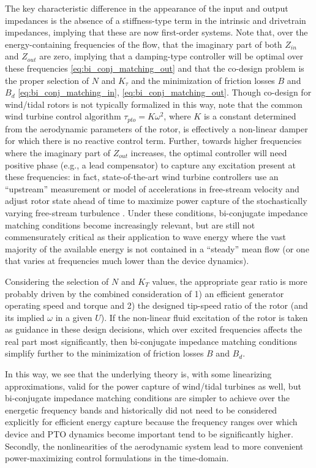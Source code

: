 \documentclass[lettersize,journal]{IEEEtran}
\begin{document}
{The key characteristic difference in the appearance of the input and output impedances is the absence of a stiffness-type term in the intrinsic and drivetrain impedances, implying that these are now first-order systems.
Note that, over the energy-containing frequencies of the flow, that the imaginary part of both $Z_{in}$ and $Z_{out}$ are zero, implying that a damping-type controller will be optimal over these frequencies \eqref{eq:bi_conj_matching_out} and that the co-design problem is the proper selection of $N$ and $K_\tau$ and the minimization of friction losses $B$ and $B_d$ \eqref{eq:bi_conj_matching_in}, \eqref{eq:bi_conj_matching_out}.
Though co-design for wind/tidal rotors is not typically formalized in this way, note that the common wind turbine control algorithm $\tau_{pto} = K\omega^2$, where $K$ is a constant determined from the aerodynamic parameters of the rotor, is effectively a non-linear damper for which there is no reactive control term.
Further, towards higher frequencies where the imaginary part of $Z_{out}$ increases, the optimal controller will need positive phase (e.g., a lead compensator) to capture any excitation present at these frequencies: in fact, state-of-the-art wind turbine controllers use an ``upstream'' measurement or model of accelerations in free-stream velocity and adjust rotor state ahead of time to maximize power capture of the stochastically varying free-stream turbulence \cite{Schlipf2013b}.
Under these conditions, bi-conjugate impedance matching conditions become increasingly relevant, but are still not commensurately critical as their application to wave energy where the vast majority of the available energy is not contained in a ``steady'' mean flow (or one that varies at frequencies much lower than the device dynamics).

Considering the selection of $N$ and $K_T$ values, the appropriate gear ratio is more probably driven by the combined consideration of 1) an efficient generator operating speed and torque and 2) the designed tip-speed ratio of the rotor (and its implied $\omega$ in a given $U$).
If the non-linear fluid excitation of the rotor is taken as guidance in these design decisions, which over excited frequencies affects the real part most significantly, then bi-conjugate impedance matching conditions simplify further to the minimization of friction losses $B$ and $B_d$.

In this way, we see that the underlying theory is, with some linearizing approximations, valid for the power capture of wind/tidal turbines as well, but bi-conjugate impedance matching conditions are simpler to achieve over the energetic frequency bands and historically did not need to be considered explicitly for efficient energy capture because the frequency ranges over which device and PTO dynamics become important tend to be significantly higher.
Secondly, the nonlinearities of the aerodynamic system lead to more convenient power-maximizing control formulations in the time-domain.

}
\end{document}
